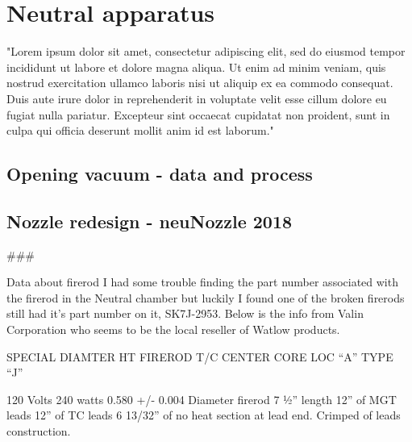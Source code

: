 \chapter{Neutral apparatus }
"Lorem ipsum dolor sit amet, consectetur adipiscing elit, sed do eiusmod tempor incididunt ut labore et dolore magna aliqua. Ut enim ad minim veniam, quis nostrud exercitation ullamco laboris nisi ut aliquip ex ea commodo consequat. Duis aute irure dolor in reprehenderit in voluptate velit esse cillum dolore eu fugiat nulla pariatur. Excepteur sint occaecat cupidatat non proident, sunt in culpa qui officia deserunt mollit anim id est laborum."

\section{Opening vacuum - data and process}

\section{Nozzle redesign - neuNozzle 2018}

###

Data about firerod
I had some trouble finding the part number associated with the firerod in the Neutral chamber but luckily I found one of the broken firerods still had it's part number on it, SK7J-2953. 
Below is the info from Valin Corporation who seems to be the local reseller of Watlow products.

SPECIAL DIAMTER
HT FIREROD   
T/C CENTER CORE LOC “A” TYPE “J”
 
120 Volts
240 watts
0.580 +/- 0.004 Diameter firerod
7 ½” length
12” of MGT leads
12” of TC leads
6 13/32” of no heat section at lead end.
Crimped of leads construction.

